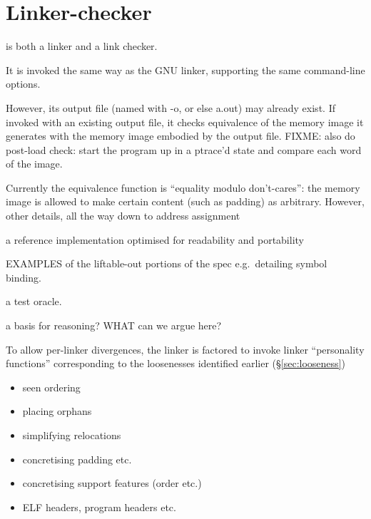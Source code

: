\section{Linker-checker}

is both a linker and a link checker.

It is invoked the same way as the GNU linker, supporting the same command-line options.

However, its output file (named with \textsf{-o}, or else \textsf{a.out}) may already exist.
If invoked with an existing output file,
it checks equivalence of the memory image it generates
with the memory image embodied by the output file.
FIXME: also do post-load check: start the program up in a ptrace'd state 
and compare each word of the image.

Currently the equivalence function is ``equality modulo don't-cares'': the 
memory image is allowed to make certain content (such as padding) as arbitrary.
However, other details, all the way down to address assignment 

a reference implementation optimised for readability
and portability

EXAMPLES of the liftable-out portions of the spec 
e.g.\ detailing symbol binding.

a test oracle.

a basis for reasoning? WHAT can we argue here?


To allow per-linker divergences, 
the linker is factored to invoke 
linker ``personality functions'' corresponding to 
the loosenesses identified earlier (\S\ref{sec:looseness})

\begin{itemize}

\item seen ordering

\item placing orphans

\item simplifying relocations

\item concretising padding etc.

\item concretising support features (order etc.)

\item ELF headers, program headers etc.

\end{itemize}



